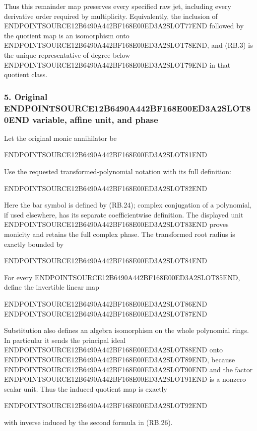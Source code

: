 Thus this remainder map preserves every specified raw jet, including every derivative order required by multiplicity. Equivalently, the inclusion of ENDPOINTSOURCE12B6490A442BF168E00ED3A2SLOT77END followed by the quotient map is an isomorphism onto ENDPOINTSOURCE12B6490A442BF168E00ED3A2SLOT78END, and (RB.3) is the unique representative of degree below ENDPOINTSOURCE12B6490A442BF168E00ED3A2SLOT79END in that quotient class.

\subsubsection{\texorpdfstring{5. Original ENDPOINTSOURCE12B6490A442BF168E00ED3A2SLOT80END variable, affine unit, and phase}{5. Original  variable, affine unit, and phase}}\label{endpoint-relation_balance_original--original-s-variable-affine-unit-and-phase}

Let the original monic annihilator be

ENDPOINTSOURCE12B6490A442BF168E00ED3A2SLOT81END

Use the requested transformed-polynomial notation with its full definition:

ENDPOINTSOURCE12B6490A442BF168E00ED3A2SLOT82END

Here the bar symbol is defined by (RB.24); complex conjugation of a polynomial, if used elsewhere, has its separate coefficientwise definition. The displayed unit ENDPOINTSOURCE12B6490A442BF168E00ED3A2SLOT83END proves monicity and retains the full complex phase. The transformed root radius is exactly bounded by

ENDPOINTSOURCE12B6490A442BF168E00ED3A2SLOT84END

For every ENDPOINTSOURCE12B6490A442BF168E00ED3A2SLOT85END, define the invertible linear map

ENDPOINTSOURCE12B6490A442BF168E00ED3A2SLOT86END ENDPOINTSOURCE12B6490A442BF168E00ED3A2SLOT87END

Substitution also defines an algebra isomorphism on the whole polynomial rings. In particular it sends the principal ideal ENDPOINTSOURCE12B6490A442BF168E00ED3A2SLOT88END onto ENDPOINTSOURCE12B6490A442BF168E00ED3A2SLOT89END, because ENDPOINTSOURCE12B6490A442BF168E00ED3A2SLOT90END and the factor ENDPOINTSOURCE12B6490A442BF168E00ED3A2SLOT91END is a nonzero scalar unit. Thus the induced quotient map is exactly

ENDPOINTSOURCE12B6490A442BF168E00ED3A2SLOT92END

with inverse induced by the second formula in (RB.26).

